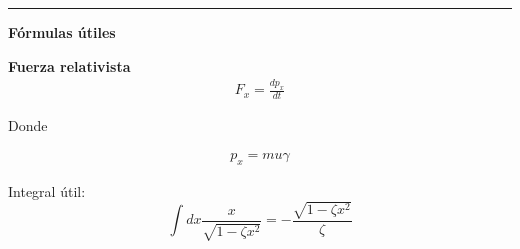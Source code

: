 \documentclass[12pt]{article}
\begin{document}
\noindent\rule{16.5cm}{0.4pt}




\begin{center}
\textbf{Fórmulas útiles}
\end{center}




\textbf{Fuerza relativista}\\



\begin{align*}
F_x = \frac{d p_x}{dt}
\end{align*}


Donde

\begin{align*}
p_x = m u \gamma
\end{align*}

Integral útil: $$  \int dx  \frac{x}{\sqrt{1-\zeta x^2}} = -\frac{\sqrt{1-\zeta x^2}}{\zeta}$$
\end{document}
